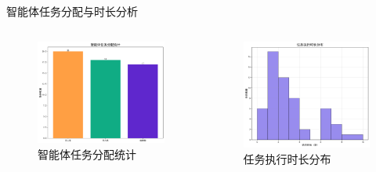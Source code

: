 \documentclass[
10pt,
aspectratio=169,
]{beamer}
\begin{document}
\begin{frame}{智能体任务分配与时长分析}
    \begin{columns}
        \begin{column}{0.5\textwidth}
            \begin{figure}
                \centering
                \includegraphics[width=\textwidth]{analysis_results/agent_distribution_20250617_081450.png}
                \caption{智能体任务分配统计}
            \end{figure}
        \end{column}
        \begin{column}{0.5\textwidth}
            \begin{figure}
                \centering
                \includegraphics[width=\textwidth]{analysis_results/duration_histogram_20250617_081450.png}
                \caption{任务执行时长分布}
            \end{figure}
        \end{column}
    \end{columns}
    

\end{frame}
\end{document}
